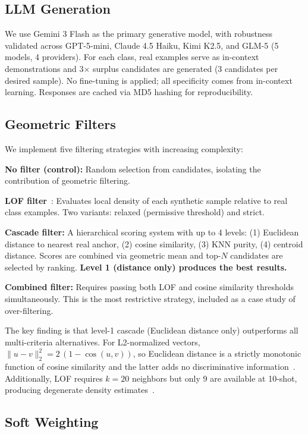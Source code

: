 \documentclass[conference]{IEEEtran}
\begin{document}
\subsection{LLM Generation}

We use Gemini 3 Flash as the primary generative model, with robustness validated across GPT-5-mini, Claude 4.5 Haiku, Kimi K2.5, and GLM-5 (5 models, 4 providers). For each class, real examples serve as in-context demonstrations and 3$\times$ surplus candidates are generated (3 candidates per desired sample). No fine-tuning is applied; all specificity comes from in-context learning. Responses are cached via MD5 hashing for reproducibility.

\subsection{Geometric Filters}

We implement five filtering strategies with increasing complexity:

\textbf{No filter (control):} Random selection from candidates, isolating the contribution of geometric filtering.

\textbf{LOF filter}~\cite{breunig2000lof}: Evaluates local density of each synthetic sample relative to real class examples. Two variants: relaxed (permissive threshold) and strict.

\textbf{Cascade filter:} A hierarchical scoring system with up to 4 levels: (1) Euclidean distance to nearest real anchor, (2) cosine similarity, (3) KNN purity, (4) centroid distance. Scores are combined via geometric mean and top-$N$ candidates are selected by ranking. \textbf{Level 1 (distance only) produces the best results.}

\textbf{Combined filter:} Requires passing both LOF and cosine similarity thresholds simultaneously. This is the most restrictive strategy, included as a case study of over-filtering.

The key finding is that level-1 cascade (Euclidean distance only) outperforms all multi-criteria alternatives. For L2-normalized vectors, $\|u-v\|_2^2 = 2\,(1-\cos(u,v))$, so Euclidean distance is a strictly monotonic function of cosine similarity and the latter adds no discriminative information~\cite{tessari2024diem}. Additionally, LOF requires $k=20$ neighbors but only 9 are available at 10-shot, producing degenerate density estimates~\cite{robinson2025manifold}.

\subsection{Soft Weighting}
\end{document}
